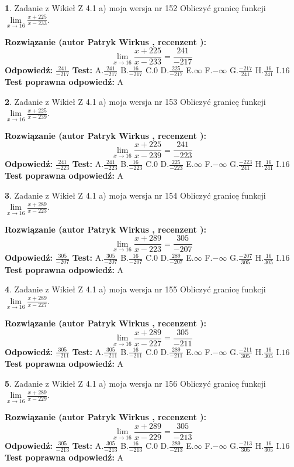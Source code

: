 \documentclass[12pt, a4paper]{article}
\theoremstyle{definition} %
\newtheorem{zad}{}
\newcommand{\zadStart}[1]{\begin{zad}#1\newline}
\newcommand{\zadStop}{\end{zad}}
\newcommand{\rozwStart}[2]{\noindent \textbf{Rozwiązanie (autor #1 , recenzent #2): }\newline}
\newcommand{\rozwStop}{\newline}
\newcommand{\odpStart}{\noindent \textbf{Odpowiedź:}\newline}
\newcommand{\odpStop}{\newline}
\newcommand{\testStart}{\noindent \textbf{Test:}\newline}
\newcommand{\testStop}{\newline}
\newcommand{\kluczStart}{\noindent \textbf{Test poprawna odpowiedź:}\newline}
\newcommand{\kluczStop}{\newline}
\begin{document}
\zadStart{Zadanie z Wikieł Z 4.1 a) moja wersja nr 152}
Obliczyć granicę funkcji $\lim\limits_{x\to16}\frac{x+225}{x-233}$.
\zadStop
\rozwStart{Patryk Wirkus}{}
$$\lim\limits_{x\to16}\frac{x+225}{x-233} = \frac{241}{-217}$$
\rozwStop
\odpStart
$\frac{241}{-217}$
\odpStop
\testStart
A.$\frac{241}{-217}$
B.$\frac{16}{-217}$
C.$0$
D.$\frac{225}{-217}$
E.$\infty$
F.$-\infty$
G.$\frac{-217}{241}$
H.$\frac{16}{241}$
I.$16$
\testStop
\kluczStart
A
\kluczStop



\zadStart{Zadanie z Wikieł Z 4.1 a) moja wersja nr 153}
Obliczyć granicę funkcji $\lim\limits_{x\to16}\frac{x+225}{x-239}$.
\zadStop
\rozwStart{Patryk Wirkus}{}
$$\lim\limits_{x\to16}\frac{x+225}{x-239} = \frac{241}{-223}$$
\rozwStop
\odpStart
$\frac{241}{-223}$
\odpStop
\testStart
A.$\frac{241}{-223}$
B.$\frac{16}{-223}$
C.$0$
D.$\frac{225}{-223}$
E.$\infty$
F.$-\infty$
G.$\frac{-223}{241}$
H.$\frac{16}{241}$
I.$16$
\testStop
\kluczStart
A
\kluczStop



\zadStart{Zadanie z Wikieł Z 4.1 a) moja wersja nr 154}
Obliczyć granicę funkcji $\lim\limits_{x\to16}\frac{x+289}{x-223}$.
\zadStop
\rozwStart{Patryk Wirkus}{}
$$\lim\limits_{x\to16}\frac{x+289}{x-223} = \frac{305}{-207}$$
\rozwStop
\odpStart
$\frac{305}{-207}$
\odpStop
\testStart
A.$\frac{305}{-207}$
B.$\frac{16}{-207}$
C.$0$
D.$\frac{289}{-207}$
E.$\infty$
F.$-\infty$
G.$\frac{-207}{305}$
H.$\frac{16}{305}$
I.$16$
\testStop
\kluczStart
A
\kluczStop



\zadStart{Zadanie z Wikieł Z 4.1 a) moja wersja nr 155}
Obliczyć granicę funkcji $\lim\limits_{x\to16}\frac{x+289}{x-227}$.
\zadStop
\rozwStart{Patryk Wirkus}{}
$$\lim\limits_{x\to16}\frac{x+289}{x-227} = \frac{305}{-211}$$
\rozwStop
\odpStart
$\frac{305}{-211}$
\odpStop
\testStart
A.$\frac{305}{-211}$
B.$\frac{16}{-211}$
C.$0$
D.$\frac{289}{-211}$
E.$\infty$
F.$-\infty$
G.$\frac{-211}{305}$
H.$\frac{16}{305}$
I.$16$
\testStop
\kluczStart
A
\kluczStop



\zadStart{Zadanie z Wikieł Z 4.1 a) moja wersja nr 156}
Obliczyć granicę funkcji $\lim\limits_{x\to16}\frac{x+289}{x-229}$.
\zadStop
\rozwStart{Patryk Wirkus}{}
$$\lim\limits_{x\to16}\frac{x+289}{x-229} = \frac{305}{-213}$$
\rozwStop
\odpStart
$\frac{305}{-213}$
\odpStop
\testStart
A.$\frac{305}{-213}$
B.$\frac{16}{-213}$
C.$0$
D.$\frac{289}{-213}$
E.$\infty$
F.$-\infty$
G.$\frac{-213}{305}$
H.$\frac{16}{305}$
I.$16$
\testStop
\kluczStart
A
\kluczStop
\end{document}
